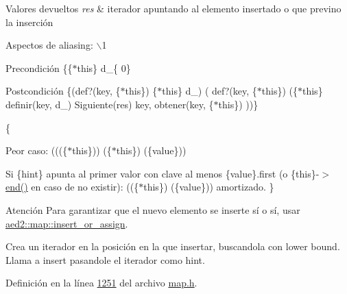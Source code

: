\begin{DoxyRetVals}{\-Valores devueltos}
{\em res} & iterador apuntando al elemento insertado o que previno la inserción\\
\hline
\end{DoxyRetVals}
\begin{DoxyParagraph}{\-Aspectos de aliasing\-:}
$\backslash$1
\end{DoxyParagraph}
\begin{DoxyPrecond}{\-Precondición}
\{\{$\ast$this\}  d\-\_\-\{ 0\} 
\end{DoxyPrecond}
\begin{DoxyPostcond}{\-Postcondición}
\{(def?(key, \{$\ast$this\})  \{$\ast$this\}  d\-\_)  ( def?(key, \{$\ast$this\})  (\{$\ast$this\}  definir(key, d\-\_)  \-Siguiente(res)   key, obtener(key, \{$\ast$this\})  ))\}
\end{DoxyPostcond}
\{
\begin{DoxyItemize}
\item \-Peor caso\-: (((\{$\ast$this\}))  (\{$\ast$this\})  (\{value\}))
\item \-Si \{hint\} apunta al primer valor con clave al menos \{value\}.first (o \{this\}-\/$>$\hyperlink{classaed2_1_1map_a76023e6a56cb625513e1b5ea028bf983_a76023e6a56cb625513e1b5ea028bf983}{end()} en caso de no existir)\-: ((\{$\ast$this\})  (\{value\})) amortizado. \}
\end{DoxyItemize}

\begin{DoxyAttention}{\-Atención}
\-Para garantizar que el nuevo elemento se inserte sí o sí, usar \hyperlink{classaed2_1_1map_a2ef6723c183916276b0afc4a4c721475_a2ef6723c183916276b0afc4a4c721475}{aed2\-::map\-::insert\-\_\-or\-\_\-assign}.
\end{DoxyAttention}
\-Crea un iterador en la posición en la que insertar, buscandola con lower bound. \-Llama a insert pasandole el iterador como hint. 

\-Definición en la línea \hyperlink{map_8h_source_l01251}{1251} del archivo \hyperlink{map_8h_source}{map.\-h}.

